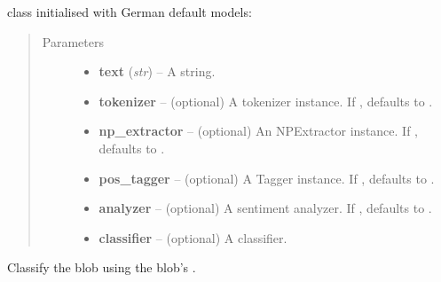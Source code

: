 \documentclass[letterpaper,10pt,english]{sphinxmanual}
\begin{document}
\begin{fulllineitems}
\label{api_reference:textblob_de.blob.TextBlobDE}
 class initialised with German default models:
\begin{quote}\begin{description}
\item[{Parameters}] \leavevmode\begin{itemize}
\item {} 
\textbf{text} (\emph{str}) -- A string.

\item {} 
\textbf{tokenizer} -- (optional) A tokenizer instance. If , defaults to
{\hyperref[api_reference:textblob_de.tokenizers.NLTKPunktTokenizer]{}}.

\item {} 
\textbf{np\_extractor} -- (optional) An NPExtractor instance. If ,
defaults to {\hyperref[api_reference:textblob_de.np_extractors.PatternParserNPExtractor]{}}.

\item {} 
\textbf{pos\_tagger} -- (optional) A Tagger instance. If , defaults to
{\hyperref[api_reference:textblob_de.taggers.PatternTagger]{}}.

\item {} 
\textbf{analyzer} -- (optional) A sentiment analyzer. If , defaults to
{\hyperref[api_reference:textblob_de.sentiments.PatternAnalyzer]{}}.

\item {} 
\textbf{classifier} -- (optional) A classifier.

\end{itemize}

\end{description}\end{quote}

\begin{fulllineitems}
\label{api_reference:textblob_de.blob.TextBlobDE.classify}
Classify the blob using the blob's .


\end{fulllineitems}
\end{fulllineitems}
\end{document}
